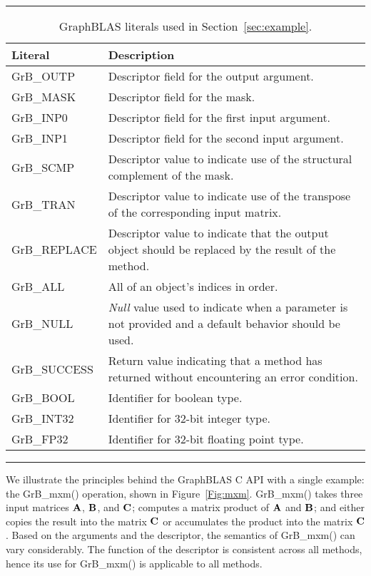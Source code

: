 \begin{table}[h]
\hrule
\begin{center}
\caption{GraphBLAS literals used in Section~\ref{sec:example}.}
\label{Tab:GrBliterals}
\begin{tabular}{lp{5.9cm}}
Literal                 & Description  \\
\hline
	{\sf GrB\_OUTP}      & Descriptor field for the output argument. \\
	{\sf GrB\_MASK}      & Descriptor field for the mask. \\
	{\sf GrB\_INP0}      & Descriptor field for the first input argument. \\
	{\sf GrB\_INP1}      & Descriptor field for the second input argument. \\ 
	{\sf GrB\_SCMP}      & Descriptor value to indicate use of the structural complement of the mask. \\
	{\sf GrB\_TRAN}      & Descriptor value to indicate use of the transpose of the corresponding input matrix. \\
	{\sf GrB\_REPLACE}   & Descriptor value to indicate that the output object should be replaced by the result of the method. \\ 
	{\sf GrB\_ALL}       & All of an object's indices in order. \\
	{\sf GrB\_NULL}      & \emph{Null} value used to indicate when a parameter is not provided and a default behavior should be used. \\
	{\sf GrB\_SUCCESS}   & Return value indicating that a method has returned without encountering an error condition. \\
	{\sf GrB\_BOOL}		   & Identifier for boolean type. \\
	{\sf GrB\_INT32}	   & Identifier for 32-bit integer type. \\
	{\sf GrB\_FP32}		   & Identifier for 32-bit floating point type. \\
\end{tabular}
\end{center}
\hrule
\end{table}

We illustrate the principles behind the GraphBLAS C API with a single example: 
the {\sf GrB\_mxm()} operation, shown in Figure~\ref{Fig:mxm}.
{\sf GrB\_mxm()} takes three input matrices ${\bf A}$, ${\bf B}$, and ${\bf C}$; 
computes a matrix product of ${\bf A}$ and ${\bf B}$; and either copies the result into the matrix ${\bf C}$
or accumulates the product into the matrix ${\bf C}$.  Based on the arguments 
and the descriptor, the semantics of {\sf GrB\_mxm()} can vary considerably.
The function of the descriptor is consistent across all methods, hence its use for
{\sf GrB\_mxm()} is applicable to all methods.

